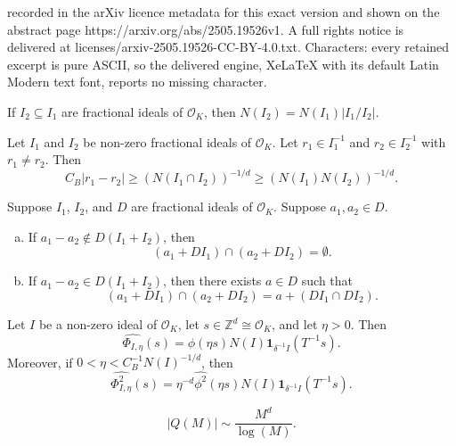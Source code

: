 \documentclass[10pt,a4paper]{amsart}
\def\ZZ{\mathbb{Z}}
\newcommand{\OK}{\mathcal{O}_K}
\newcommand{\isom}{\cong}
\begin{document}
recorded in the arXiv licence metadata for this exact version and shown on the abstract page https://arxiv.org/abs/2505.19526v1. A full rights notice is delivered at licenses/arxiv-2505.19526-CC-BY-4.0.txt. Characters: every retained excerpt is pure ASCII, so the delivered engine, XeLaTeX with its default Latin Modern text font, reports no missing character.
\begin{lemma}\label{idealquotient}
If $I_2 \subseteq I_1$ are fractional ideals of $\OK$,  
then  $N(I_2) = N(I_1)|I_1/I_2|$. 
\end{lemma}

\begin{lemma}\label{separation lemma}
Let $I_1$ and $I_2$ be non-zero fractional ideals of $\OK$. Let $r_1 \in I_1^{-1}$ and $r_2 \in I_2^{-1}$ with $r_1 \neq r_2$. Then 
$$
C_B|r_1 - r_2| 
\geq (N(I_1 \cap I_2))^{-1/d}
\geq (N(I_1) N(I_2))^{-1/d}. 
$$
\end{lemma}

\begin{lemma}\label{concrete crt lemma}
Suppose $I_1$, $I_2$, and $D$ are fractional ideals of $\OK$. 
Suppose $a_1, a_2 \in D$. 
\begin{enumerate}[(a)]
\item If $a_1 - a_2 \notin D(I_1 + I_2)$, then
\[(a_1 + DI_1) \cap (a_2 + DI_2) = \emptyset.\]
\item If $a_1 - a_2 \in D(I_1 + I_2)$, then there exists $a \in D$ such that 
$$
(a_1 + DI_1) \cap (a_2 + DI_2) = a + (D I_1 \cap DI_2).
$$
\end{enumerate}
\end{lemma}

\begin{lemma}\label{Phi-Fourier-Lemma}
Let $I$ be a non-zero ideal of $\OK$, let $s \in \ZZ^d \isom \OK$, and let 
$\eta > 0$. Then 
\begin{equation}\label{Phi-Fourier-eqn-1}
\widehat{\Phi_{I,\eta}}(s) = \widehat{\phi}(\eta s) N(I)\mathbf{1}_{\delta^{-1}I} (T^{-1} s). 
\end{equation}
Moreover, if $0 < \eta < C_B^{-1}N(I)^{-1/d}$, then  
\begin{equation}\label{Phi-Fourier-eqn-2}
\widehat{\Phi_{I,\eta}^2}(s) = \eta^{-d} \widehat{\phi^2}(\eta s) N(I)\mathbf{1}_{\delta^{-1}I} (T^{-1} s).
\end{equation}
\end{lemma}

\begin{equation}\label{QMsize}
|Q(M)| \sim \frac{M^d}{\log(M)}.
\end{equation}
\end{document}
